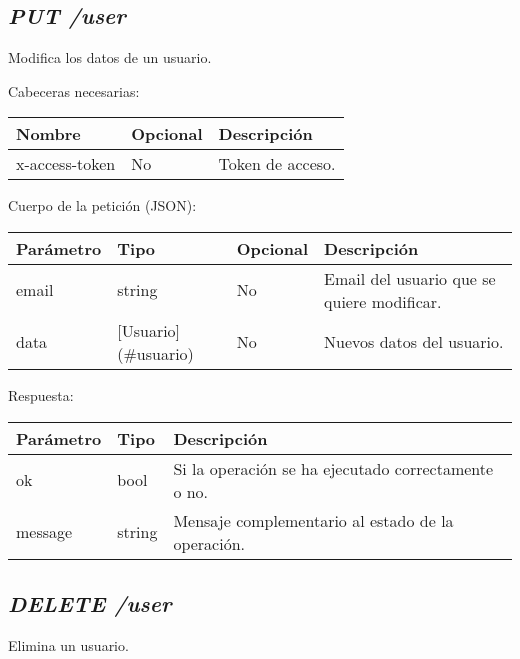 \subsection{\textit{PUT /user}}
Modifica los datos de un usuario.

Cabeceras necesarias:
\begin{table}[h!]
	\centering
	\begin{adjustbox}{max width=\textwidth}
	\begin{tabular}{|l|l|l|}
		\hline
		Nombre & Opcional & Descripción \\ \hline
		x-access-token & No & Token de acceso. \\ \hline
	\end{tabular}
\end{adjustbox}
\end{table}


Cuerpo de la petición (JSON):
\begin{table}[!h]
	\centering
	\begin{adjustbox}{max width=\textwidth}
	\begin{tabular}{|l|l|l|l|}
		\hline
		Parámetro & Tipo & Opcional & Descripción \\ \hline
		email & string & No & Email del usuario que se quiere modificar. \\ \hline
		data & [Usuario](\#usuario) & No & Nuevos datos del usuario. \\ \hline
	\end{tabular}
\end{adjustbox}
\end{table}

Respuesta:
\begin{table}[!h]
	\centering
	\begin{adjustbox}{max width=\textwidth}
	\begin{tabular}{|l|l|l|}
		\hline
		Parámetro & Tipo & Descripción \\ \hline
		ok & bool & Si la operación se ha ejecutado correctamente o no. \\ \hline
		message & string & Mensaje complementario al estado de la operación. \\ \hline
	\end{tabular}
\end{adjustbox}
\end{table}








\subsection{\textit{DELETE /user}}
Elimina un usuario.

